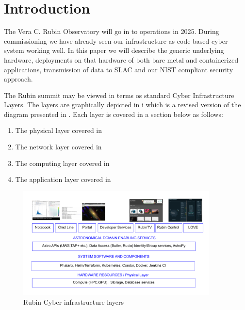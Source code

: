 \section{Introduction}

The Vera C. Rubin Observatory\cite{2019ApJ...873..111I} will go in to operations in 2025.
During commissioning we have already seen our infrastructure as code based cyber system working well.
In this paper we will describe the generic underlying hardware, deployments on that hardware of both bare metal and containerized applications, transmission of data to SLAC and our NIST\cite{NIST.SP.800-171} compliant security approach.

The Rubin summit may be viewed in terms os standard Cyber Infrastructure Layers.
The layers are graphically depicted in i which is a revised version of the diagram presented in \cite{2019arXiv190713060O}.
Each layer is covered in a section below as follows:

\begin{enumerate}
\item The physical layer covered in 
\item The network layer covered in 
\item The computing layer covered in 
\item The application layer covered in 
\end{enumerate}


\begin{figure}
\begin{centering}
\includegraphics[width=0.9\textwidth]{images/CI-Rubin }
	\caption{Rubin Cyber infrastructure layers
\label{fig:ci-rubin}}
\end{centering}
\end{figure}



